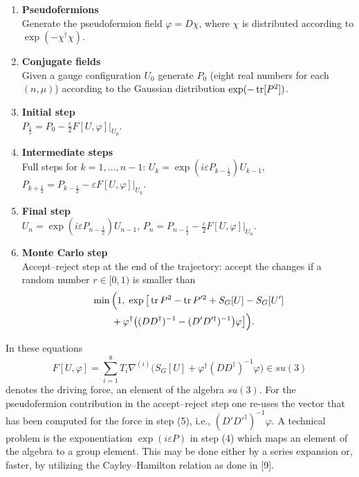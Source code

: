 \begin{enumerate}
  \item \textbf{Pseudofermions}\\
        Generate the pseudofermion field $\varphi = D\chi$, where $\chi$ is
        distributed according to $\exp(-\chi^\dagger\chi)$.
  \item \textbf{Conjugate fields}\\
        Given a gauge configuration $U_0$ generate $P_0$ (eight real numbers
        for each $(n,\mu)$) according to the Gaussian distribution
        $\exp(-\operatorname{tr}[P^2])$.
  \item \textbf{Initial step}\\
        $P_{\frac12} = P_0 - \frac{\varepsilon}{2}F[U,\varphi]\big|_{U_0}$.
  \item \textbf{Intermediate steps}\\
        Full steps for $k = 1, \ldots, n-1$:
        $U_k = \exp(i\varepsilon P_{k-\frac12})U_{k-1}$, \qquad
        $P_{k+\frac12} = P_{k-\frac12} - \varepsilon F[U,\varphi]\big|_{U_k}$.
  \item \textbf{Final step}\\
        $U_n = \exp(i\varepsilon P_{n-\frac12})U_{n-1}$, \qquad
        $P_n = P_{n-\frac12} - \frac{\varepsilon}{2}F[U,\varphi]\big|_{U_n}$.
  \item \textbf{Monte Carlo step}\\
        Accept--reject step at the end of the trajectory: accept the changes if
        a random number $r \in [0,1)$ is smaller than
        \begin{equation}
        \begin{aligned}
        &\min\Big(1,\;\exp\big[\operatorname{tr} P^2 - \operatorname{tr} P'^2 + S_G[U] - S_G[U']\\
        &\qquad + \varphi^\dagger\big((DD^\dagger)^{-1} - (D'D'^\dagger)^{-1}\big)\varphi\big]\Big).
        \end{aligned}
        \end{equation}
\end{enumerate}
In these equations
\begin{equation}
F[U,\varphi] = \sum_{i=1}^{8}T_i\nabla^{(i)}\Big(S_G[U] + \varphi^\dagger(DD^\dagger)^{-1}\varphi\Big) \in su(3)
\end{equation}
denotes the driving force, an element of the algebra $su(3)$.
For the pseudofermion contribution in the accept--reject step one re-uses the
vector that has been computed for the force in step (5), i.e.,
$(D'D'^\dagger)^{-1}\varphi$.
A technical problem is the exponentiation $\exp(i\varepsilon P)$ in step (4)
which maps an element of the algebra to a group element. This may be done
either by a series expansion or, faster, by utilizing the Cayley--Hamilton
relation as done in [9].

